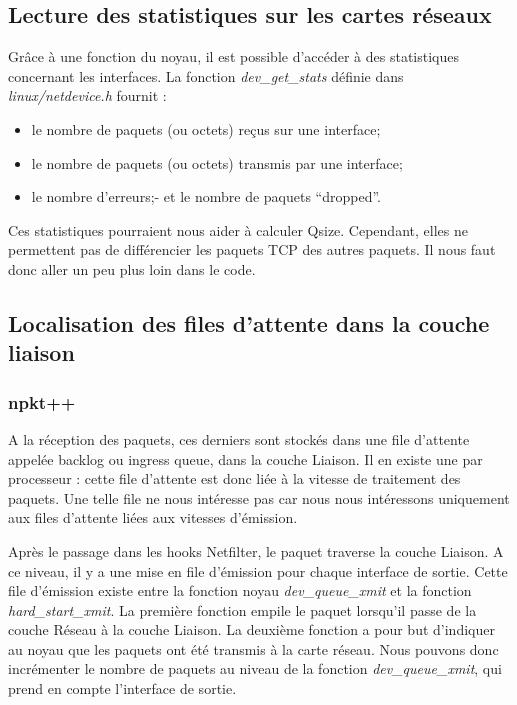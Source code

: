 \documentclass[a4paper]{article}
\begin{document}
\subsection{Lecture des statistiques sur les cartes réseaux}
Grâce à une fonction du noyau, il est possible d’accéder à des
statistiques concernant les interfaces. La fonction \textit{dev\_get\_stats}
définie dans \textit{linux/netdevice.h} fournit :
\begin{itemize}
	\item le nombre de paquets (ou octets) reçus sur une interface;
	\item le nombre de paquets (ou octets) transmis par une interface;
	\item le nombre d’erreurs;- et le nombre de paquets “dropped”.
\end{itemize}

Ces statistiques pourraient nous aider à calculer Qsize. Cependant,
elles ne permettent pas de différencier les paquets TCP des autres paquets.
Il nous faut donc aller un peu plus loin dans le code.

\subsection{Localisation des files d'attente dans la couche liaison}
\subsubsection{npkt++}
A la réception des paquets, ces derniers sont stockés dans une file d’attente appelée backlog ou ingress queue, dans la couche Liaison. Il en existe une par processeur : cette file d’attente est donc liée à la vitesse de traitement des paquets. Une telle file ne nous intéresse pas car nous nous intéressons uniquement aux files d’attente liées aux vitesses d’émission.

Après le passage dans les hooks Netfilter, le paquet traverse la couche Liaison. A ce niveau, il y a une mise en file d’émission pour chaque interface de sortie. Cette file d’émission existe entre la fonction noyau \textit{dev\_queue\_xmit} et la fonction \textit{hard\_start\_xmit}. La première fonction empile le paquet lorsqu’il passe de la couche Réseau à la couche Liaison. La deuxième fonction a pour but d’indiquer au noyau que les paquets ont été transmis à la carte réseau. Nous pouvons donc incrémenter le nombre de paquets au niveau de la fonction \textit{dev\_queue\_xmit}, qui prend en compte l’interface de sortie.
\end{document}
